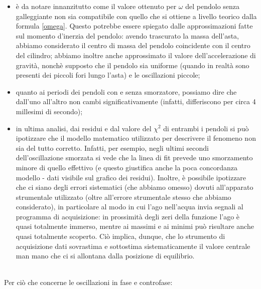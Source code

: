\documentclass{article}
\begin{document}
\begin{itemize}
    \item è da notare innanzitutto come il valore ottenuto per $\omega$ del pendolo senza galleggiante non sia compatibile con quello che si ottiene a livello teorico dalla formula \eqref{omega}. Questo potrebbe essere spiegato dalle approssimazioni fatte sul momento d'inerzia del pendolo: avendo trascurato la massa dell'asta, abbiamo considerato il centro di massa del pendolo coincidente con il centro del cilindro; abbiamo inoltre anche approssimato il valore dell'accelerazione di gravità, nonchè supposto che il pendolo sia uniforme (quando in realtà sono presenti dei piccoli fori lungo l'asta) e le oscillazioni piccole;
    \item quanto ai periodi dei pendoli con e senza smorzatore, possiamo dire che dall'uno all'altro non cambi significativamente (infatti, differiscono per circa 4 millesimi di secondo);
    \item in ultima analisi, dai residui e dal valore del $\chi^2$ di entrambi i pendoli si può ipotizzare che il modello matematico utilizzato per descrivere il fenomeno non sia del tutto corretto. Infatti, per esempio, negli ultimi secondi dell'oscillazione smorzata si vede che la linea di fit prevede uno smorzamento minore di quello effettivo (e questo giustifica anche la poca concordanza modello - dati visibile sul grafico dei residui). Inoltre, è possibile ipotizzare che ci siano degli errori sistematici (che abbiamo omesso) dovuti all'apparato strumentale utilizzato (oltre all'errore strumentale stesso che abbiamo considerato), in particolare al modo in cui l'ago nell'acqua invia segnali al programma di acquisizione: in prossimità degli zeri della funzione l'ago è quasi totalmente immerso, mentre ai massimi e ai minimi può risultare anche quasi totalmente scoperto. Ciò implica, dunque, che lo strumento di acquisizione dati sovrastima e sottostima sistematicamente il valore centrale man mano che ci si allontana dalla posizione di equilibrio.
\end{itemize}
\\
Per ciò che concerne le oscillazioni in fase e controfase:
\end{document}
